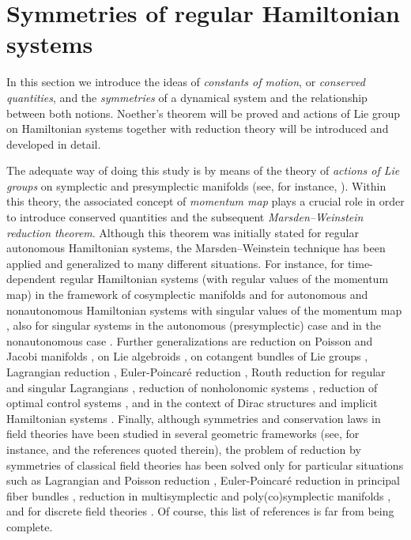 \documentclass[12pt]{report}
\begin{document}
\section{Symmetries of regular Hamiltonian systems}
\label{secsym}


In this section we introduce the ideas of {\sl constants of motion}, or {\sl conserved quantities}, and the {\sl symmetries} of a dynamical system and the relationship between both notions. Noether's theorem will be proved and actions of Lie group on Hamiltonian systems together with reduction theory will be introduced and developed in detail.

The adequate way of doing this study
is by means of the theory of {\sl actions of Lie groups} on
symplectic and presymplectic manifolds
(see, for instance, \cite{AM-78,CP-adg,EMR-99,Gi-hss,GGK-2002,LM-sgam,MSSV-85,Ok-87}).
Within this theory, the associated concept of {\sl momentum map} plays a crucial role 
in order to introduce conserved quantities and the subsequent 
{\sl Marsden--Weinstein reduction theorem}.
Although this theorem was initially stated for regular autonomous Hamiltonian systems,
the Marsden--Weinstein technique has been applied and generalized to many different situations.
For instance,  for time-dependent regular Hamiltonian systems 
(with regular values of the momentum map)
in the framework of cosymplectic manifolds \cite{albert} and
for autonomous and nonautonomous Hamiltonian systems 
with singular values of the momentum map \cite{ACG-91,LS-93,SL-91},
also for singular systems in the autonomous (presymplectic)
case \cite{CCCI-86,EMR-99} and in the nonautonomous case \cite{LMR-92,IM-92}.
Further generalizations are reduction on Poisson and Jacobi manifolds \cite{CCM-2007,GLMV-94,LOT-2009,MR-86,NP-2002,NP-2005},
on Lie algebroids \cite{CNS-2005,CNS-2007},
on cotangent bundles of Lie groups \cite{MRW-84},
Lagrangian reduction \cite{CMR-2001,MS-93}, Euler-Poincar\'e reduction \cite{CGR-2001,CRS-2000},
Routh reduction for regular and singular Lagrangians \cite{CL-2010,LCV-2010},
reduction of nonholonomic systems \cite{BS-93,BKMM-1996,CLMM-98,Ma-95},
reduction of optimal control systems \cite{BC-99,Ma-2004,Su-95,Sh-87},
and in the context of Dirac structures and implicit Hamiltonian systems
\cite{BVS-2000,MCL-01}.
Finally, although symmetries and conservation laws in field theories
have been studied in several geometric frameworks (see, for instance,
\cite{LMS-2004,Gimmsy,GR-2023,MRSV-2010,RSV-2007}
and the references quoted therein),
the problem of reduction by symmetries of classical field theories
has been solved only for particular situations such as Lagrangian and Poisson
reduction \cite{CM-2003}, Euler-Poincar\'e reduction in principal fiber bundles 
\cite{CGR-2007,CR-2003},
reduction in multisymplectic and poly(co)symplectic manifolds \cite{LGRRV-2022,LRVZ-2023,EMR-2018,MRSV-2015},
and for discrete field theories \cite{Va-2007}.
Of course, this list of references is far from being complete.
\end{document}
